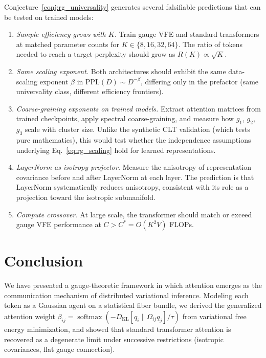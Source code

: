 \documentclass[twoside,11pt]{article}
\newcommand{\softmax}{\operatorname{softmax}}
\newcommand{\KL}{\operatorname{KL}}
\begin{document}
Conjecture~\ref{conj:rg_universality} generates several falsifiable predictions that can be tested on trained models:
\begin{enumerate}
\item \emph{Sample efficiency grows with $K$.} Train gauge VFE and standard transformers at matched parameter counts for $K \in \{8, 16, 32, 64\}$. The ratio of tokens needed to reach a target perplexity should grow as $R(K) \propto \sqrt{K}$.
\item \emph{Same scaling exponent.} Both architectures should exhibit the same data-scaling exponent $\beta$ in $\mathrm{PPL}(D) \sim D^{-\beta}$, differing only in the prefactor (same universality class, different efficiency frontiers).
\item \emph{Coarse-graining exponents on trained models.} Extract attention matrices from trained checkpoints, apply spectral coarse-graining, and measure how $g_1$, $g_2$, $g_3$ scale with cluster size. Unlike the synthetic CLT validation (which tests pure mathematics), this would test whether the independence assumptions underlying Eq.~\eqref{eq:rg_scaling} hold for learned representations.
\item \emph{LayerNorm as isotropy projector.} Measure the anisotropy of representation covariance before and after LayerNorm at each layer. The prediction is that LayerNorm systematically reduces anisotropy, consistent with its role as a projection toward the isotropic submanifold.
\item \emph{Compute crossover.} At large scale, the transformer should match or exceed gauge VFE performance at $C > C^* = O(K^2 V)$ FLOPs.
\end{enumerate}

\section{Conclusion}

We have presented a gauge-theoretic framework in which attention emerges as the communication mechanism of distributed variational inference. Modeling each token as a Gaussian agent on a statistical fiber bundle, we derived the generalized attention weight $\beta_{ij} = \softmax(-D_{\KL}[q_i \| \Omega_{ij} q_j]/\tau)$ from variational free energy minimization, and showed that standard transformer attention is recovered as a degenerate limit under successive restrictions (isotropic covariances, flat gauge connection).
\end{document}
